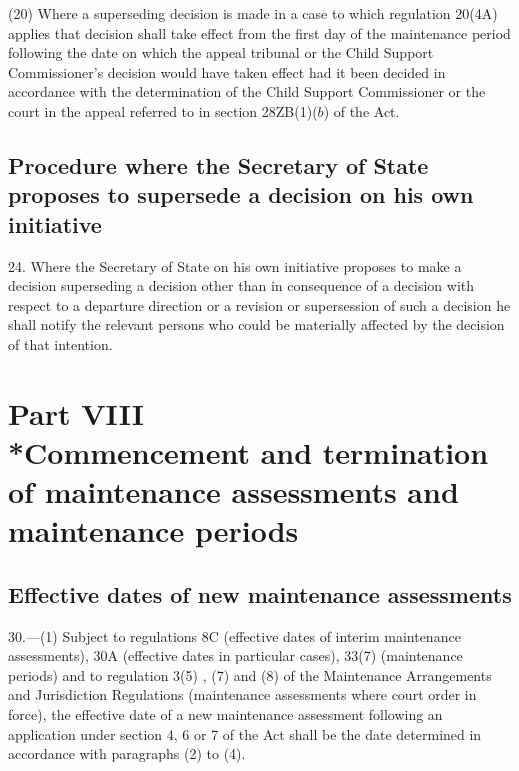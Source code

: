 \documentclass[a4paper,12pt]{article}
\begin{document}
(20) Where a superseding decision is made in a case to which regulation 20(4A) applies that decision shall take effect from the first day of the maintenance period following the date on which the appeal tribunal or the Child Support Commissioner’s decision would have taken effect had it been decided in accordance with the determination of the Child Support Commissioner or the court in the appeal referred to in section 28ZB(1)($b$)  of the Act.


\subsection[24. Procedure where the Secretary of State proposes to supersede a decision on his own initiative]{Procedure where the Secretary of State proposes to supersede a decision on his own initiative}

24.  Where the Secretary of State on his own initiative proposes to make a decision superseding a decision other than in consequence of a decision with respect to a departure direction or a revision or supersession of such a decision he shall notify the relevant persons who could be materially affected by the decision of that intention.

\section[Part VIII --- Commencement and termination of maintenance assessments and maintenance periods]{\sloppy Part VIII\\*Commencement and termination of maintenance assessments and maintenance periods}

\renewcommand\parthead{--- Part VIII}

\subsection[30. Effective dates of new maintenance assessments]{Effective dates of new maintenance assessments}

30.—(1) Subject to 
regulations 8C (effective dates of interim maintenance assessments), 30A (effective dates in particular cases), 33(7) (maintenance periods)  %
and to regulation 3(5)%
, (7) and (8)  %
of the Maintenance Arrangements and Jurisdiction Regulations (maintenance assessments where court order in force),  %
 the effective date of a new maintenance assessment following an application under section 4, 6 or 7 of the Act shall be the date determined in accordance with paragraphs (2) to (4).
\end{document}
